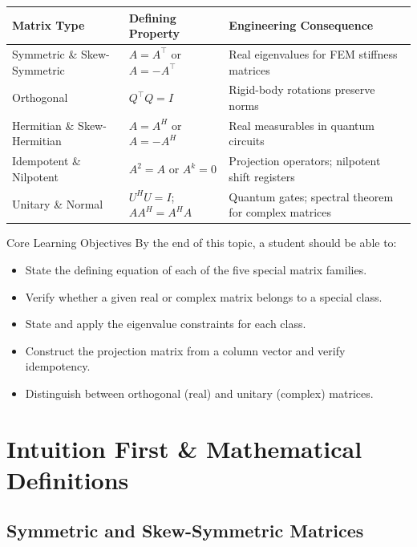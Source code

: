\documentclass[12pt,a4paper]{article}
\begin{document}
\vspace{0.5em}
\begin{center}
\begin{tabular}{@{}lll@{}}
\toprule
\textbf{Matrix Type} & \textbf{Defining Property} & \textbf{Engineering Consequence} \\
\midrule
Symmetric \& Skew-Symmetric & $A = A^\top$ or $A = -A^\top$ & Real eigenvalues for FEM stiffness matrices \\
Orthogonal & $Q^\top Q = I$ & Rigid-body rotations preserve norms \\
Hermitian \& Skew-Hermitian & $A = A^H$ or $A = -A^H$ & Real measurables in quantum circuits \\
Idempotent \& Nilpotent & $A^2 = A$ or $A^k = 0$ & Projection operators; nilpotent shift registers \\
Unitary \& Normal & $U^H U = I$; $AA^H = A^H A$ & Quantum gates; spectral theorem for complex matrices \\
\bottomrule
\end{tabular}
\end{center}

\vspace{1em}
\begin{learnbox}{Core Learning Objectives}
By the end of this topic, a student should be able to:
\begin{itemize}
  \item State the defining equation of each of the five special matrix families.
  \item Verify whether a given real or complex matrix belongs to a special class.
  \item State and apply the eigenvalue constraints for each class.
  \item Construct the projection matrix from a column vector and verify idempotency.
  \item Distinguish between orthogonal (real) and unitary (complex) matrices.
\end{itemize}
\end{learnbox}

\section{Intuition First \& Mathematical Definitions}

\subsection{Symmetric and Skew-Symmetric Matrices}
\end{document}
